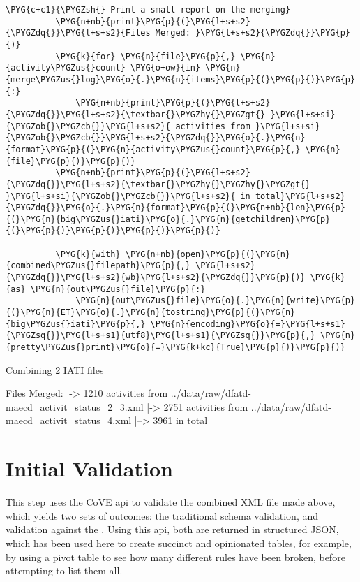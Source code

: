 \documentclass[letterpaper,10pt,english]{sphinxmanual}
\begin{document}
\begin{Verbatim}[commandchars=\\\{\}]
          \PYG{c+c1}{\PYGZsh{} Print a small report on the merging}
          \PYG{n+nb}{print}\PYG{p}{(}\PYG{l+s+s2}{\PYGZdq{}}\PYG{l+s+s2}{Files Merged: }\PYG{l+s+s2}{\PYGZdq{}}\PYG{p}{)}
          \PYG{k}{for} \PYG{n}{file}\PYG{p}{,} \PYG{n}{activity\PYGZus{}count} \PYG{o+ow}{in} \PYG{n}{merge\PYGZus{}log}\PYG{o}{.}\PYG{n}{items}\PYG{p}{(}\PYG{p}{)}\PYG{p}{:}
              \PYG{n+nb}{print}\PYG{p}{(}\PYG{l+s+s2}{\PYGZdq{}}\PYG{l+s+s2}{\textbar{}\PYGZhy{}\PYGZgt{} }\PYG{l+s+si}{\PYGZob{}\PYGZcb{}}\PYG{l+s+s2}{ activities from }\PYG{l+s+si}{\PYGZob{}\PYGZcb{}}\PYG{l+s+s2}{\PYGZdq{}}\PYG{o}{.}\PYG{n}{format}\PYG{p}{(}\PYG{n}{activity\PYGZus{}count}\PYG{p}{,} \PYG{n}{file}\PYG{p}{)}\PYG{p}{)}
          \PYG{n+nb}{print}\PYG{p}{(}\PYG{l+s+s2}{\PYGZdq{}}\PYG{l+s+s2}{\textbar{}\PYGZhy{}\PYGZhy{}\PYGZgt{} }\PYG{l+s+si}{\PYGZob{}\PYGZcb{}}\PYG{l+s+s2}{ in total}\PYG{l+s+s2}{\PYGZdq{}}\PYG{o}{.}\PYG{n}{format}\PYG{p}{(}\PYG{n+nb}{len}\PYG{p}{(}\PYG{n}{big\PYGZus{}iati}\PYG{o}{.}\PYG{n}{getchildren}\PYG{p}{(}\PYG{p}{)}\PYG{p}{)}\PYG{p}{)}\PYG{p}{)}
          
          \PYG{k}{with} \PYG{n+nb}{open}\PYG{p}{(}\PYG{n}{combined\PYGZus{}filepath}\PYG{p}{,} \PYG{l+s+s2}{\PYGZdq{}}\PYG{l+s+s2}{wb}\PYG{l+s+s2}{\PYGZdq{}}\PYG{p}{)} \PYG{k}{as} \PYG{n}{out\PYGZus{}file}\PYG{p}{:}
              \PYG{n}{out\PYGZus{}file}\PYG{o}{.}\PYG{n}{write}\PYG{p}{(}\PYG{n}{ET}\PYG{o}{.}\PYG{n}{tostring}\PYG{p}{(}\PYG{n}{big\PYGZus{}iati}\PYG{p}{,} \PYG{n}{encoding}\PYG{o}{=}\PYG{l+s+s1}{\PYGZsq{}}\PYG{l+s+s1}{utf8}\PYG{l+s+s1}{\PYGZsq{}}\PYG{p}{,} \PYG{n}{pretty\PYGZus{}print}\PYG{o}{=}\PYG{k+kc}{True}\PYG{p}{)}\PYG{p}{)}
\end{Verbatim}
%
\begin{OriginalVerbatim}[commandchars=\\\{\}]

Combining 2 IATI files

Files Merged:
|-> 1210 activities from ../data/raw/dfatd-maecd\_activit\_status\_2\_3.xml
|-> 2751 activities from ../data/raw/dfatd-maecd\_activit\_status\_4.xml
|--> 3961 in total
\end{OriginalVerbatim}
\relax

\chapter{Initial Validation}
\label{\detokenize{Global Affairs Canada - Compliance Report:Initial-Validation}}
This step uses the CoVE api to validate the combined XML file made
above, which yields two sets of outcomes: the traditional schema
validation, and validation against the . Using this api,
both are returned in structured JSON, which has been used here to create
succinct and opinionated tables, for example, by using a pivot table to
see how many different rules have been broken, before attempting to list
them all.
\end{document}
